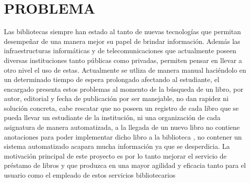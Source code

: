 \section{PROBLEMA} 

\begin{enumerate}[1.]
    
    Las bibliotecas siempre han estado al tanto de nuevas tecnologías que permitan desempeñar de una manera mejor su papel de brindar información. Además las infraestructuras informáticas y de telecomunicaciones que actualmente poseen diversas instituciones tanto públicas como privadas, permiten pensar en llevar a otro nivel el uso de estas.
    Actualmente se utliza de manera manual haciéndolo en un determinado tiempo de espera prolongado afectando al estudiante, el encargado presenta estos problemas al momento de la búsqueda de un libro, por autor, editorial y fecha de publicación por ser manejable, no dan rapidez ni solución concreta, cabe rescatar que no poseen un registro de cada libro que se pueda llevar un estudiante de la institución, ni una organización de cada asignatura de manera automatizada, a la llegada de un nuevo libro no contiene anotaciones para poder implementar dicho libro a la biblioteca , no contener un sistema automatizado acapara mucha información ya que se desperdicia.
La motivación principal de este proyecto es por lo tanto mejorar el servicio de préstamo de libros y que produzca en una mayor agilidad y eficacia tanto para el usuario como el empleado de estos servicios bibliotecarios


\end{enumerate} 
